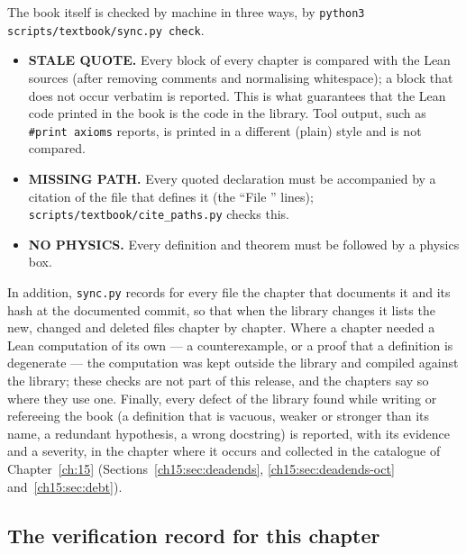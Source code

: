 The book itself is checked by machine in three ways, by \texttt{python3 scripts/textbook/sync.py
check}.
\begin{itemize}
\item \textbf{STALE QUOTE.} Every  block of every chapter is compared with the Lean
  sources (after removing comments and normalising whitespace); a block that does not occur
  verbatim is reported. This is what guarantees that the Lean code printed in the book is the code
  in the library. Tool output, such as \texttt{\#print axioms} reports, is printed in a different
  (plain) style and is not compared.
\item \textbf{MISSING PATH.} Every quoted declaration must be accompanied by a citation of the file
  that defines it (the ``File '' lines); \texttt{scripts/textbook/cite\_paths.py}
  checks this.
\item \textbf{NO PHYSICS.} Every definition and theorem must be followed by a physics box.
\end{itemize}
In addition, \texttt{sync.py} records for every  file the chapter that documents it and
its hash at the documented commit, so that when the library changes it lists the new, changed and
deleted files chapter by chapter. Where a chapter needed a Lean computation of its own --- a
counterexample, or a proof that a definition is degenerate --- the computation was kept outside the
library and compiled against the library; these checks are not part of this release, and the
chapters say so where they use one. Finally, every defect of the library
found while writing or refereeing the book (a definition that is vacuous, weaker or stronger than its
name, a redundant hypothesis, a wrong docstring) is reported, with its evidence and a severity, in the
chapter where it occurs and collected in the catalogue of Chapter~\ref{ch:15}
(Sections~\ref{ch15:sec:deadends}, \ref{ch15:sec:deadends-oct} and~\ref{ch15:sec:debt}).

\subsection{The verification record for this chapter}

